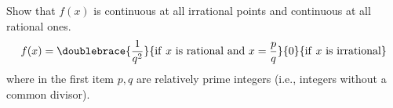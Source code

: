 Show that $f(x)$ is continuous at all irrational points and continuous at all rational ones.
\[
f(x)=\doublebrace{\frac{1}{q^2}}{\mathrm{if~}x\mathrm{~is~rational~and~} x=\frac{p}{q} }{0}{\mathrm{if~}x~\mathrm{is~irrational}}
\]
where in the first item $p,q$ are relatively prime integers (i.e., integers without a common divisor).
